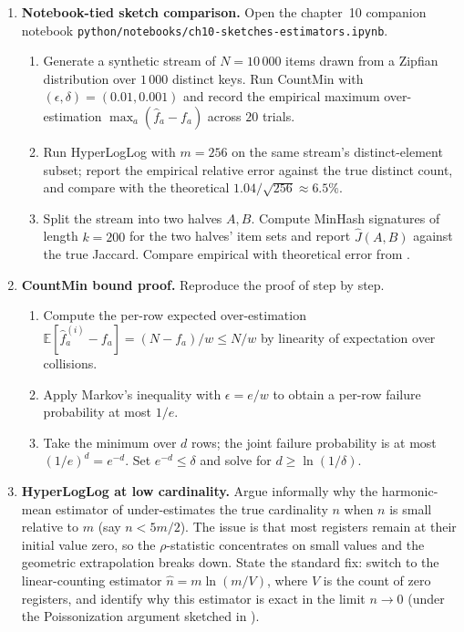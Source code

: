 \begin{enumerate}
\item \exstarstar
\label{ex:ch10-4}
\textbf{Notebook-tied sketch comparison.}
Open the chapter~10 companion notebook
\texttt{python/notebooks/ch10-sketches-estimators.ipynb}.
\begin{enumerate}
  \item[(a)] Generate a synthetic stream of $N = 10\,000$ items
    drawn from a Zipfian distribution over $1\,000$ distinct keys.
    Run CountMin with $(\epsilon, \delta) = (0.01, 0.001)$ and
    record the empirical maximum over-estimation $\max_a
    (\hat{f}_a - f_a)$ across $20$ trials.
  \item[(b)] Run HyperLogLog with $m = 256$ on the same stream's
    distinct-element subset; report the empirical relative error
    against the true distinct count, and compare with the
    theoretical $1.04 / \sqrt{256} \approx 6.5\%$.
  \item[(c)] Split the stream into two halves $A, B$. Compute
    MinHash signatures of length $k = 200$ for the two halves'
    item sets and report $\hat{J}(A, B)$ against the true Jaccard.
    Compare empirical with theoretical error from
    .
\end{enumerate}

\item \exstarstar
\label{ex:ch10-5}
\textbf{CountMin bound proof.}
Reproduce the proof of  step by step.
\begin{enumerate}
  \item[(a)] Compute the per-row expected over-estimation
    $\mathbb{E}[\hat{f}_a^{(i)} - f_a] = (N - f_a) / w \le N / w$
    by linearity of expectation over collisions.
  \item[(b)] Apply Markov's inequality with $\epsilon = e / w$ to
    obtain a per-row failure probability at most $1 / e$.
  \item[(c)] Take the minimum over $d$ rows; the joint failure
    probability is at most $(1 / e)^d = e^{-d}$. Set $e^{-d} \le
    \delta$ and solve for $d \ge \ln(1 / \delta)$.
\end{enumerate}

\item \exstarstar
\label{ex:ch10-6}
\textbf{HyperLogLog at low cardinality.}
Argue informally why the harmonic-mean estimator of
 under-estimates the true cardinality $n$
when $n$ is small relative to $m$ (say $n < 5m/2$). The issue is
that most registers remain at their initial value zero, so the
$\rho$-statistic concentrates on small values and the geometric
extrapolation breaks down. State the standard fix: switch to the
linear-counting estimator $\hat{n} = m \ln(m / V)$, where $V$ is
the count of zero registers, and identify why this estimator is
exact in the limit $n \to 0$ (under the Poissonization argument
sketched in ).


\end{enumerate}
